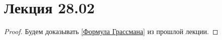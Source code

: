 \section{Лекция 28.02}
\begin{proof}
    Будем доказывать \ref{Формула Грассмана} из прошлой лекции.
\end{proof}
